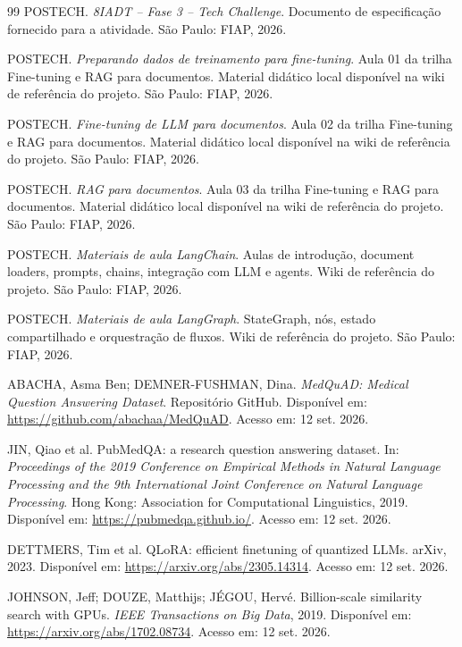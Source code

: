 \documentclass[12pt,a4paper]{article}
\begin{document}
\clearpage
\begin{thebibliography}{99}
POSTECH. \textit{8IADT -- Fase 3 -- Tech Challenge}. Documento de especificação fornecido para a atividade. São Paulo: FIAP, 2026.

POSTECH. \textit{Preparando dados de treinamento para fine-tuning}. Aula 01 da trilha Fine-tuning e RAG para documentos. Material didático local disponível na wiki de referência do projeto. São Paulo: FIAP, 2026.

POSTECH. \textit{Fine-tuning de LLM para documentos}. Aula 02 da trilha Fine-tuning e RAG para documentos. Material didático local disponível na wiki de referência do projeto. São Paulo: FIAP, 2026.

POSTECH. \textit{RAG para documentos}. Aula 03 da trilha Fine-tuning e RAG para documentos. Material didático local disponível na wiki de referência do projeto. São Paulo: FIAP, 2026.

POSTECH. \textit{Materiais de aula LangChain}. Aulas de introdução, document loaders, prompts, chains, integração com LLM e agents. Wiki de referência do projeto. São Paulo: FIAP, 2026.

POSTECH. \textit{Materiais de aula LangGraph}. StateGraph, nós, estado compartilhado e orquestração de fluxos. Wiki de referência do projeto. São Paulo: FIAP, 2026.

ABACHA, Asma Ben; DEMNER-FUSHMAN, Dina. \textit{MedQuAD: Medical Question Answering Dataset}. Repositório GitHub. Disponível em: \url{https://github.com/abachaa/MedQuAD}. Acesso em: 12 set. 2026.

JIN, Qiao et al. PubMedQA: a research question answering dataset. In: \textit{Proceedings of the 2019 Conference on Empirical Methods in Natural Language Processing and the 9th International Joint Conference on Natural Language Processing}. Hong Kong: Association for Computational Linguistics, 2019. Disponível em: \url{https://pubmedqa.github.io/}. Acesso em: 12 set. 2026.

DETTMERS, Tim et al. QLoRA: efficient finetuning of quantized LLMs. arXiv, 2023. Disponível em: \url{https://arxiv.org/abs/2305.14314}. Acesso em: 12 set. 2026.

JOHNSON, Jeff; DOUZE, Matthijs; JÉGOU, Hervé. Billion-scale similarity search with GPUs. \textit{IEEE Transactions on Big Data}, 2019. Disponível em: \url{https://arxiv.org/abs/1702.08734}. Acesso em: 12 set. 2026.

\end{thebibliography}
\end{document}
